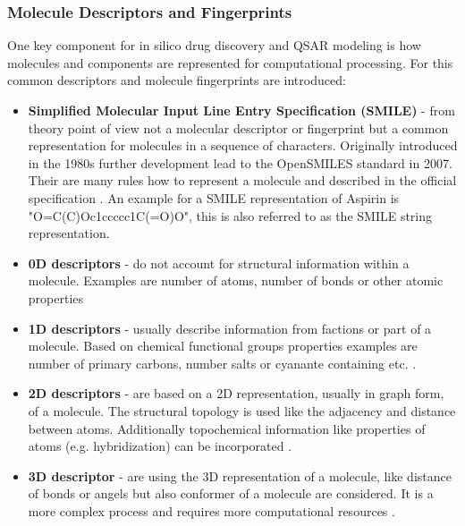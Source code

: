\documentclass[../main.tex]{subfiles}
\begin{document}
\subsubsection{Molecule Descriptors and Fingerprints} \label{sssec:molecule_descriptors_and_fingerprints}

One key component for in silico drug discovery and QSAR modeling is how molecules and components are represented for computational processing. For this common descriptors and molecule fingerprints are introduced:

\begin{itemize}
    \item \textbf{Simplified Molecular Input Line Entry Specification (SMILE)} - from theory point of view not a molecular descriptor or fingerprint but a common representation for molecules in a sequence of characters. Originally introduced in the 1980s \cite{weininger_smiles_1988} further development lead to the OpenSMILES standard in 2007. Their are many rules how to represent a molecule and described in the official specification \cite{noauthor_opensmiles_nodate}. An example for a SMILE representation of Aspirin is "O=C(C)Oc1ccccc1C(=O)O", this is also referred to as the SMILE string representation. 

    \item \textbf{0D descriptors} - do not account for structural information within a molecule. Examples are number of atoms, number of bonds or other atomic properties \cite{carracedo-reboredo_review_2021}

    \item \textbf{1D descriptors} - usually describe information from factions or part of a molecule. Based on chemical functional groups properties examples are number of primary carbons, number salts or cyanante containing etc. \cite{carracedo-reboredo_review_2021}.

    \item \textbf{2D descriptors} - are based on a 2D representation, usually in graph form, of a molecule. The structural topology is used like the adjacency and distance between atoms. Additionally topochemical information like properties of atoms (e.g. hybridization) can be incorporated \cite{carracedo-reboredo_review_2021}.

    \item \textbf{3D descriptor} - are using the 3D representation of a molecule, like distance of bonds or angels but also conformer of a molecule are considered. It is a more complex process and requires more computational resources \cite{carracedo-reboredo_review_2021}.


\end{itemize}
\end{document}
